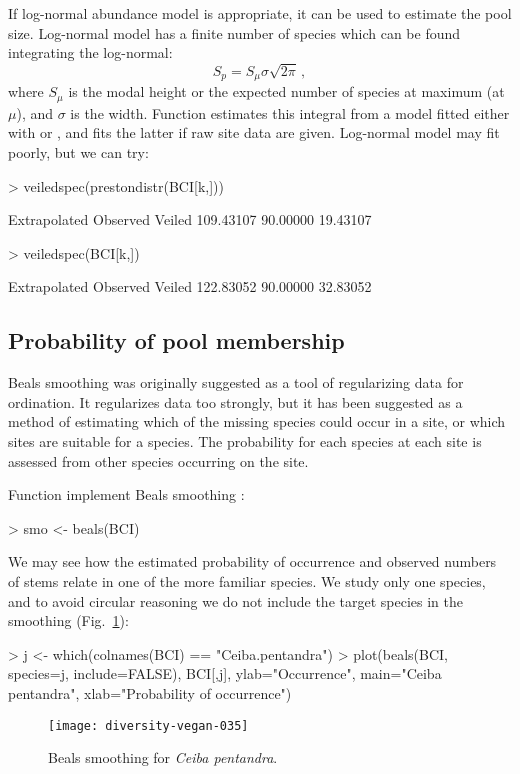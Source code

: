 \documentclass[a4paper,10pt,twocolumn]{article}
\begin{document}
If log-normal abundance model is appropriate, it can be used to
estimate the pool size.  Log-normal model has a finite number of
species which can be found integrating the log-normal:
\begin{equation}
S_p = S_\mu \sigma \sqrt{2 \pi} \,,
\end{equation}
where $S_\mu$ is the modal height or the expected number of species at
maximum (at $\mu$), and $\sigma$ is the width.  Function
 estimates this integral from a model fitted either
with  or , and fits the latter
if raw site data are given.  Log-normal model may fit poorly, but we
can try:
\begin{Schunk}
\begin{Sinput}
> veiledspec(prestondistr(BCI[k,]))
\end{Sinput}
\begin{Soutput}
Extrapolated     Observed       Veiled 
   109.43107     90.00000     19.43107 
\end{Soutput}
\begin{Sinput}
> veiledspec(BCI[k,])
\end{Sinput}
\begin{Soutput}
Extrapolated     Observed       Veiled 
   122.83052     90.00000     32.83052 
\end{Soutput}
\end{Schunk}

\subsection{Probability of pool membership}

Beals smoothing was originally suggested as a tool of regularizing data
for ordination.  It regularizes data too strongly,
but it has been suggested as a method of estimating which of the
missing species could occur in a site, or which sites are suitable for
a species.  The probability for each species at each site is assessed
from other species occurring on the site.

Function  implement Beals smoothing \citep{McCune87,
  DeCaceresLegendre08}:
\begin{Schunk}
\begin{Sinput}
> smo <- beals(BCI)
\end{Sinput}
\end{Schunk}
We may see how the estimated probability of occurrence and observed
numbers of stems relate in one of the more familiar species. We study
only one species, and to avoid circular reasoning we do not include
the target species in the smoothing (Fig.~\ref{fig:beals}):
\begin{Schunk}
\begin{Sinput}
> j <- which(colnames(BCI) == "Ceiba.pentandra")
> plot(beals(BCI, species=j, include=FALSE), BCI[,j], 
       ylab="Occurrence", main="Ceiba pentandra", 
       xlab="Probability of occurrence")
\end{Sinput}
\end{Schunk}
\begin{figure}
\texttt{[image: diversity-vegan-035]}
\caption{Beals smoothing for \emph{Ceiba pentandra}.}
\label{fig:beals}
\end{figure}


\end{document}
